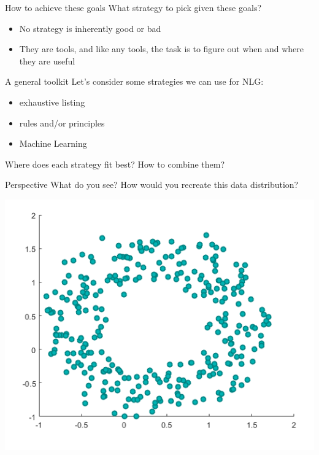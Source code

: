 \documentclass[10pt, compress]{beamer}		%
\begin{document}
\begin{frame}{How to achieve these goals}
	What strategy to pick given these goals? \pause
    \begin{itemize}
		\item No strategy is inherently good or bad \pause
		\item They are tools, and like any tools, the task is to figure out when and where they are useful
	\end{itemize}
\end{frame}

\begin{frame}{A general toolkit}
	Let's consider some strategies we can use for NLG: \pause

	\begin{itemize}
		\item exhaustive listing \pause
		\item rules and/or principles \pause
		\item Machine Learning \pause
	\end{itemize}

	\pause

	Where does each strategy fit best? How to combine them?
\end{frame}

\begin{frame}{Perspective}
	What do you see? How would you recreate this data distribution?
	\begin{center}
		\includegraphics[width=.8\textwidth]{images/circleplot.png}
	\end{center}
\end{frame}
\end{document}
